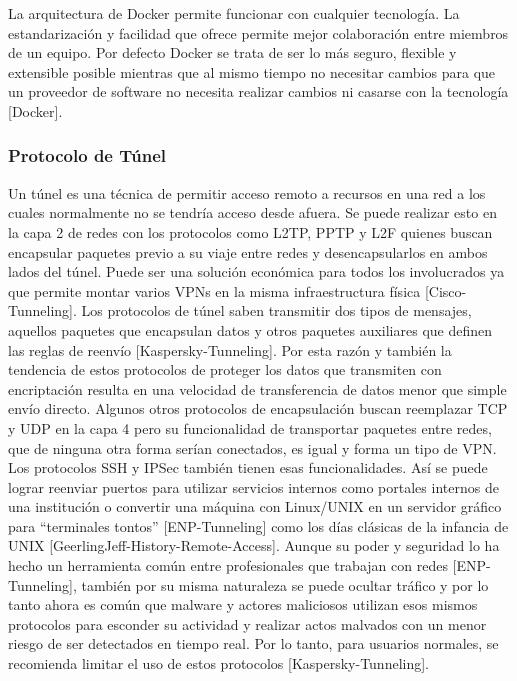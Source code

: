 La arquitectura de Docker permite funcionar con cualquier tecnología. La estandarización y facilidad que ofrece permite mejor colaboración entre miembros de un equipo. Por defecto Docker se trata de ser lo más seguro, flexible y extensible posible mientras que al mismo tiempo no necesitar cambios para que un proveedor de software no necesita realizar cambios ni casarse con la tecnología [Docker].

\subsubsection{Protocolo de Túnel}
Un túnel es una técnica de permitir acceso remoto a recursos en una red a los cuales normalmente no se tendría acceso desde afuera. Se puede realizar esto en la capa 2 de redes con los protocolos como L2TP, PPTP y L2F quienes buscan encapsular paquetes previo a su viaje entre redes y desencapsularlos en ambos lados del túnel. Puede ser una solución económica para todos los involucrados ya que permite montar varios VPNs en la misma infraestructura física [Cisco-Tunneling]. Los protocolos de túnel saben transmitir dos tipos de mensajes, aquellos paquetes que encapsulan datos y otros paquetes auxiliares que definen las reglas de reenvío [Kaspersky-Tunneling]. Por esta razón y también la tendencia de estos protocolos de proteger los datos que transmiten con encriptación resulta en una velocidad de transferencia de datos menor que simple envío directo. Algunos otros protocolos de encapsulación buscan reemplazar TCP y UDP en la capa 4 pero su funcionalidad de transportar paquetes entre redes, que de ninguna otra forma serían conectados, es igual y forma un tipo de VPN. Los protocolos SSH y IPSec también tienen esas funcionalidades. Así se puede lograr reenviar puertos para utilizar servicios internos como portales internos de una institución o convertir una máquina con Linux/UNIX en un servidor gráfico para “terminales tontos” [ENP-Tunneling] como los días clásicas de la infancia de UNIX [GeerlingJeff-History-Remote-Access]. Aunque su poder y seguridad lo ha hecho un herramienta común entre profesionales que trabajan con redes [ENP-Tunneling], también por su misma naturaleza se puede ocultar tráfico y por lo tanto ahora es común que malware y actores maliciosos utilizan esos mismos protocolos para esconder su actividad y realizar actos malvados con un menor riesgo de ser detectados en tiempo real. Por lo tanto, para usuarios normales, se recomienda limitar el uso de estos protocolos [Kaspersky-Tunneling].

